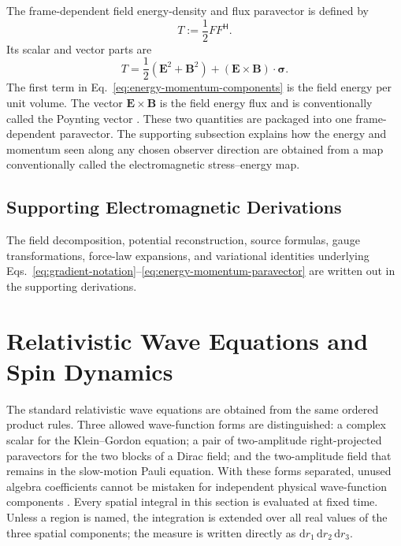 \documentclass[10pt,letterpaper]{article}
\newcommand{\pv}[1]{#1}
\newcommand{\vct}[1]{\mathbf{#1}}
\newcommand{\sigv}{\vct{\pv{\bm{\sigma}}}}
\newcommand{\Hop}{\mathsf H}
\newcommand{\herm}[1]{#1^{\Hop}}
\newcommand{\dd}{\mathrm d}
\begin{document}
The frame-dependent field energy-density and flux paravector is defined by
\begin{equation}
\pv{T}:=\frac{1}{2}\pv{F}\herm{\pv{F}}.
\label{eq:energy-momentum-paravector}
\end{equation}
Its scalar and vector parts are
\begin{equation}
\pv{T}
=\frac{1}{2}(\vct{E}^2+\vct{B}^2)
+(\vct{E}\times\vct{B})\cdot\sigv.
\label{eq:energy-momentum-components}
\end{equation}
The first term in Eq.\ \eqref{eq:energy-momentum-components} is the field
energy per unit volume. The vector \(\vct{E}\times\vct{B}\) is the field
energy flux and is conventionally called the Poynting vector
\cite{jackson1998}. These two quantities are packaged into one
frame-dependent paravector. The supporting subsection explains how the
energy and momentum seen along any chosen observer direction are obtained
from a map conventionally called the electromagnetic stress--energy map.

\subsection{Supporting Electromagnetic Derivations}
The field decomposition, potential reconstruction, source formulas, gauge transformations, force-law expansions, and variational identities underlying Eqs.\ \eqref{eq:gradient-notation}--\eqref{eq:energy-momentum-paravector} are written out in the supporting derivations.


\section{Relativistic Wave Equations and Spin Dynamics}\label{sec:qm}
The standard relativistic wave equations are obtained from the same ordered
product rules. Three allowed wave-function forms are distinguished: a complex
scalar for the Klein--Gordon equation; a pair of two-amplitude right-projected
paravectors for the two blocks of a Dirac field; and the two-amplitude field
that remains in the slow-motion Pauli equation. With these forms separated,
unused algebra coefficients cannot be mistaken for independent physical
wave-function components
\cite{klein1926,gordon1926,dirac1928,pauli1927}.
Every spatial integral in this section is evaluated at fixed time. Unless a
region is named, the integration is extended over all real values of the three spatial
components; the measure is written directly as
\(\dd r_1\,\dd r_2\,\dd r_3\).
\end{document}
